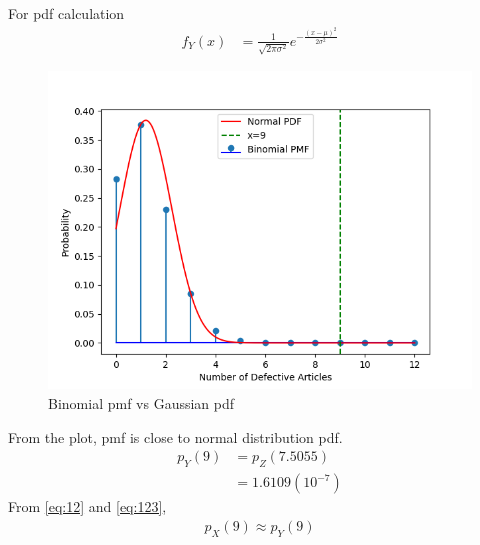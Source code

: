 \documentclass[journal,12pt,twocolumn]{IEEEtran}
\theoremstyle{remark}
\begin{document}
For pdf calculation
\begin{align}
f_Y(x)&=\frac{1}{\sqrt{2\pi\sigma^2}}e^{-\frac{(x-\mu)^2}{2\sigma^2}}
\end{align}
\begin{figure}[!ht]
\centering
\includegraphics[width=\columnwidth]{figs/figure.png}
\caption{Binomial pmf vs Gaussian pdf }
\label{fig:Triangle}
\end{figure}
From the plot, pmf is close to normal distribution pdf.
\begin{align}
p_Y(9)&=p_Z(7.5055)\\
&=1.6109(10^{-7})
\label{eq:123}
\end{align}
From \eqref{eq:12} and \eqref{eq:123},
\begin{align}
p_X(9)\approx p_Y(9)
\end{align}
\end{document}
